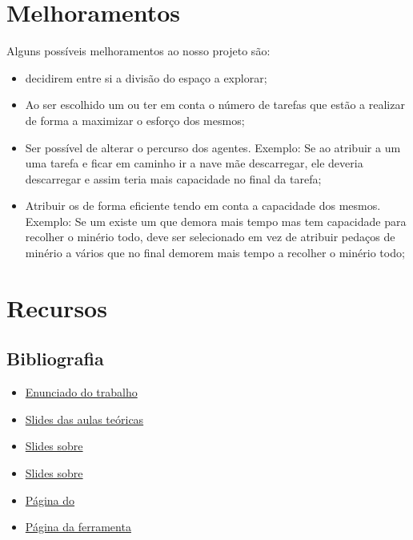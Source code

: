 \documentclass[12pt]{report}
\begin{document}
\chapter{Melhoramentos}


Alguns possíveis melhoramentos ao nosso projeto são:

\begin{itemize}
	\item \Spotters decidirem entre si a divisão do espaço a explorar;
	\item Ao ser escolhido um \producer ou \transporter ter em conta o número de tarefas que estão a realizar de forma a maximizar o esforço dos mesmos;
	\item Ser possível de alterar o percurso dos agentes. Exemplo: Se ao atribuir a um \transporter uma tarefa e ficar em caminho ir a nave mãe descarregar, ele deveria descarregar e assim teria mais capacidade no final da tarefa;
	\item Atribuir os \transporters de forma eficiente tendo em conta a capacidade dos mesmos. Exemplo: Se um existe um \transporter que demora mais tempo mas tem capacidade para recolher o minério todo, deve ser selecionado em vez de atribuir pedaços de minério a vários \transporters que no final demorem mais tempo a recolher o minério todo;
\end{itemize}

\chapter{Recursos}

\section{Bibliografia}


\begin{itemize}
	\item \href{https://paginas.fe.up.pt/~eol/AIAD/1617/trabalhos.html#T05}{Enunciado do trabalho}
	\item \href{https://paginas.fe.up.pt/~eol/AIAD/aiad1617.html}{Slides das aulas teóricas}
	\item \href{https://paginas.fe.up.pt/~eol/AIAD/aulas/jade_en.pdf}{Slides sobre \jade}
	\item \href{https://paginas.fe.up.pt/~eol/AIAD/aulas/REPAST_intro_hlc.pdf}{Slides sobre \repast}
	\item \href{https://web.fe.up.pt/~hlc/doku.php?id=sajas}{Página do \sajas}
	\item \href{https://web.fe.up.pt/~hlc/doku.php?id=massim2dev}{Página da ferramenta \massim}
\end{itemize}
\end{document}
